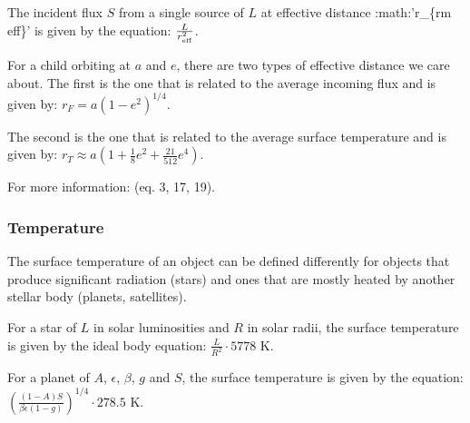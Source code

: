 \documentclass[letterpaper,10pt,english]{sphinxmanual}
\begin{document}
\sphinxAtStartPar
The incident flux \(S\) from a single source of {\hyperref[\detokenize{quantities/surface/emission/luminosity:id1}]{}} \(L\)
at effective distance :math:’r\_\{rm eff\}’ is given by the equation: \(\frac{L}{r_{\rm eff}^2}\).

\sphinxAtStartPar
For a child orbiting at {\hyperref[\detokenize{quantities/orbital/semi_major_axis:id1}]{}} \(a\)
and {\hyperref[\detokenize{quantities/orbital/eccentricity:id1}]{}} \(e\),
there are two types of effective distance we care about.
The first is the one that is related to the average incoming flux and is given by:
\(r_F = a \left(1 - e^2\right)^{1/4}\).

\sphinxAtStartPar
The second is the one that is related to the average surface temperature and is given by:
\(r_T \approx a (1 + \frac{1}{8} e^2 + \frac{21}{512} e^4)\).

\sphinxAtStartPar
For more information:  (eq. 3, 17, 19).


\subsubsection{Temperature}
\label{\detokenize{quantities/surface/emission/temperature:temperature}}\label{\detokenize{quantities/surface/emission/temperature::doc}}\label{\detokenize{quantities/surface/emission/temperature:id1}}
\sphinxAtStartPar
The surface temperature of an object can be defined differently for objects
that produce significant radiation (stars) and ones that are mostly heated
by another stellar body (planets, satellites).

\sphinxAtStartPar
For a star of {\hyperref[\detokenize{quantities/surface/emission/luminosity:id1}]{}} \(L\) in solar luminosities
and {\hyperref[\detokenize{quantities/geometric/radius:id1}]{}} \(R\) in solar radii, the surface temperature
is given by the ideal body equation: \(\frac{L}{R^2} \cdot 5778\) K.

\sphinxAtStartPar
For a planet of {\hyperref[\detokenize{quantities/surface/emission/albedo:id1}]{}} \(A\), {\hyperref[\detokenize{quantities/surface/emission/emissivity:id1}]{}} \(\epsilon\),
{\hyperref[\detokenize{quantities/surface/emission/heat_distribution:id1}]{}} \(\beta\),
{\hyperref[\detokenize{quantities/surface/emission/normalized_greenhouse:id1}]{}} \(g\) and
{\hyperref[\detokenize{quantities/surface/emission/incident_flux:id1}]{}} \(S\),
the surface temperature is given by the equation:
\(\left(\frac{(1 - A) S}{\beta \epsilon (1 - g)}\right)^{1/4} \cdot 278.5\) K.
\end{document}
